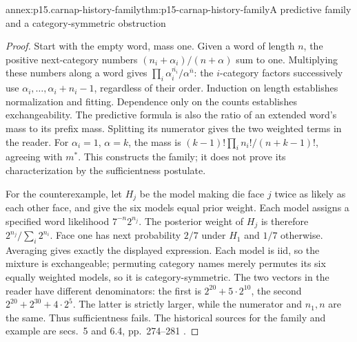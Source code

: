 \begin{annexitem}{annex:p15.carnap-history-family}{thm:p15-carnap-history-family}{A predictive family and a category-symmetric obstruction}
\begin{proof}
Start with the empty word, mass one. Given a word of length \(n\),
the positive next-category numbers \((n_i+\alpha_i)/(n+\alpha)\)
sum to one. Multiplying these numbers along a word gives
\(\prod_i\alpha_i^{\overline{n_i}}/\alpha^{\overline n}\):
the \(i\)-category factors successively use
\(\alpha_i,\ldots,\alpha_i+n_i-1\), regardless of their order.
Induction on length establishes normalization and fitting. Dependence
only on the counts establishes exchangeability. The predictive formula
is also the ratio of an extended word's mass to its prefix mass.
Splitting its numerator gives the two weighted terms in the reader.
For \(\alpha_i=1\), \(\alpha=k\), the mass is
\((k-1)!\prod_i n_i!/(n+k-1)!\), agreeing with \(m^*\).
This constructs the family; it does not prove its characterization by
the sufficientness postulate.

For the counterexample, let \(H_j\) be the model making die face
\(j\) twice as likely as each other face, and give the six models equal
prior weight. Each model assigns a specified word likelihood
\(7^{-n}2^{n_j}\). The posterior weight of \(H_j\) is therefore
\(2^{n_j}/\sum_i2^{n_i}\). Face one has next probability \(2/7\)
under \(H_1\) and \(1/7\) otherwise. Averaging gives exactly the
displayed expression. Each model is iid, so the mixture is exchangeable;
permuting category names merely permutes its six equally weighted models,
so it is category-symmetric. The two vectors in the reader have different
denominators: the first is \(2^{20}+5\cdot2^{10}\), the second
\(2^{20}+2^{30}+4\cdot2^5\). The latter is strictly larger, while
the numerator and \(n_1,n\) are the same. Thus sufficientness fails.
The historical sources for the family and example are secs.~5 and 6.4,
pp.~274--281 \cite{Zabell2011CarnapInductiveInference}.
\end{proof}
\end{annexitem}

